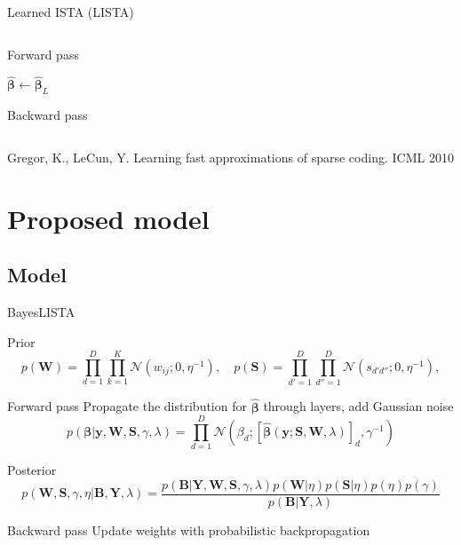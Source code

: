 \documentclass[9pt]{beamer}
\begin{document}
\begin{frame}{Learned ISTA (LISTA)}
\begin{columns}
\begin{column}{0.6\textwidth}
\begin{block}{Forward pass}
\begin{algorithmic}[1]
      \ENDFOR
      \RETURN $\widehat{\boldsymbol\beta} \gets \widehat{\boldsymbol\beta}_{L}$
    \end{algorithmic}
    \end{block}
    \begin{block}{Backward pass}
     \begin{algorithmic}[1]
       \end{algorithmic}
    \end{block}
        \end{column}
      \end{columns}
      \footnotesize{Gregor, K., LeCun, Y. Learning fast approximations of sparse coding. ICML 2010}
\end{frame}

\section[Proposed model]{Proposed model}
\subsection[Model]{Model}
\begin{frame}{BayesLISTA}
  \begin{block}{Prior}
    \begin{equation*}
      p(\mathbf{W}) = \prod_{d=1}^D\prod_{k=1}^K \mathcal{N}(w_{ij} ; 0, \eta^{-1}), \quad
      p(\mathbf{S}) = \prod_{d'=1}^D\prod_{d''=1}^D \mathcal{N}(s_{d'd''} ; 0, \eta^{-1}),
    \end{equation*}
    \end{block}
    \begin{block}{Forward pass}
    Propagate the distribution for $\widehat{\boldsymbol\beta}$ through layers, add Gaussian noise
    \begin{equation*}
      p(\mathbf{\boldsymbol\beta}| \mathbf{y}, \mathbf{W}, \mathbf{S}, \gamma, \lambda)
      = \prod_{d=1}^D\mathcal{N}\left(\beta_d; [\widehat{\boldsymbol\beta}(\mathbf{y} ; \mathbf{S}, \mathbf{W}, \lambda)]_d, \gamma^{-1}\right)
    \end{equation*}
    \end{block}
    \begin{block}{Posterior}
  \begin{equation*}
  p(\mathbf{W}, \mathbf{S}, \gamma, \eta | \mathbf{B}, \mathbf{Y}, \lambda)
  = \frac{p(\mathbf{B} | \mathbf{Y}, \mathbf{W},  \mathbf{S}, \gamma, \lambda) p(\mathbf{W} | \eta )p(\mathbf{S} | \eta) p(\eta) p(\gamma)}{p(\mathbf{B} | \mathbf{Y}, \lambda)}
  \end{equation*}
  \end{block}
   \begin{block}{Backward pass}
   Update weights with probabilistic backpropagation
    \end{block}
 
  \end{frame}
\end{document}
